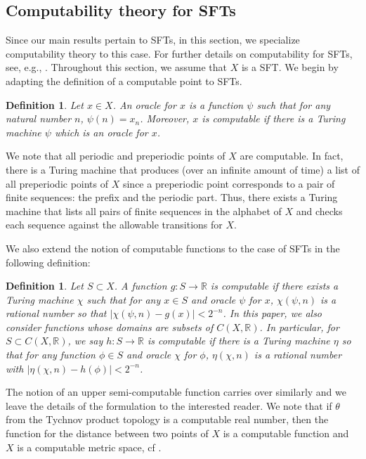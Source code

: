 \documentclass[11pt, reqno]{amsart}
\newtheorem{definition}[theorem]{Definition}
\newcommand{\bR}{{\mathbb R}}
\begin{document}
\subsection{Computability theory for SFTs}

Since our main results pertain to SFTs, in this section, we specialize computability theory to this case.  For further details on computability for SFTs, see, e.g., \cite{BSW}.  Throughout this section, we assume that $X$ is a SFT.  We begin by adapting the definition of a computable point to SFTs.

\begin{definition}
Let $x\in X$.  An {\em oracle} for $x$ is a function $\psi$ such that for any natural number $n$, $\psi(n)=x_n$.  Moreover, $x$ is {\em computable} if there is a Turing machine $\psi$ which is an oracle for $x$.
\end{definition}

We note that all periodic and preperiodic points of $X$ are computable.  In fact, there is a Turing machine that produces (over an infinite amount of time) a list of all preperiodic points of $X$ since a preperiodic point corresponds to a pair of finite sequences: the prefix and the periodic part.  Thus, there exists a Turing machine that lists all pairs of finite sequences in the alphabet of $X$ and checks each sequence against the allowable transitions for $X$.

We also extend the notion of computable functions to the case of SFTs in the following definition:

\begin{definition}
Let $S\subset X$.  A function $g:S\rightarrow\bR$ is {\em computable} if there exists a Turing machine $\chi$ such that for any $x\in S$ and oracle $\psi$ for $x$, $\chi(\psi,n)$ is a rational number so that $|\chi(\psi,n)-g(x)|<2^{-n}$.  In this paper, we also consider functions whose domains are subsets  of $C(X,\bR)$.  In particular, for $S\subset C(X,\bR)$, we say $h:S\rightarrow\bR$ is computable if there is a Turing machine $\eta$ so that for any function $\phi\in S$ and oracle $\chi$ for $\phi$, $\eta(\chi,n)$ is a rational number with $|\eta(\chi,n)-h(\phi)|<2^{-n}$.
\end{definition}

The notion of an upper semi-computable function carries over similarly and we leave the details of the formulation to the interested reader.  We note that if $\theta$ from the Tychnov product topology is a computable real number, then the function for the distance between two points of $X$ is a computable function and $X$ is a computable metric space, cf {\cite[Definition 2.2]{GHR}}.
\end{document}
